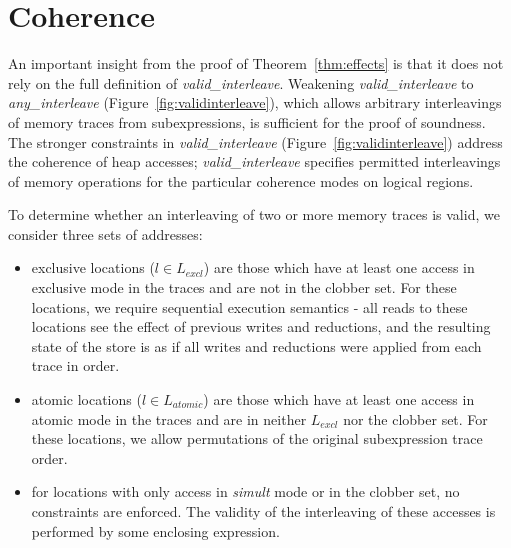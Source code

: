 \section{Coherence}
\label{sec:coherence}

An important insight from the proof of Theorem~\ref{thm:effects} is that 
it does not rely on the full definition of {\em valid\_interleave}.  Weakening 
{\em valid\_interleave} to {\em any\_interleave} (Figure~\ref{fig:validinterleave}), 
which  allows arbitrary interleavings of memory traces from subexpressions, 
is sufficient for the proof of soundness.  
The stronger constraints in {\em valid\_interleave}
(Figure~\ref{fig:validinterleave}) address the coherence of heap accesses;
{\em valid\_interleave} specifies permitted interleavings of memory operations for
the particular coherence modes on logical regions.

To determine whether an interleaving of two or more memory traces is valid, we consider three sets of addresses:
\begin{itemize}
\item exclusive locations ($l \in L_{excl}$) are those which have at least one access in exclusive mode in the traces
and are not in the clobber set.  For these locations, we require sequential execution semantics - all
reads to these locations see the effect of previous writes and reductions, and the resulting state of the store is
as if all writes and reductions were applied from each trace in order.
\item atomic locations ($l \in L_{atomic}$) are those which have at least one access in atomic mode in the traces and
are in neither $L_{excl}$ nor the clobber set.  For these locations, we allow permutations of the original
subexpression trace order.
\item for locations with only access in {\em simult} mode or in the clobber set, no constraints are
enforced.  The validity of the interleaving of these accesses is performed by some enclosing expression.
\end{itemize}

